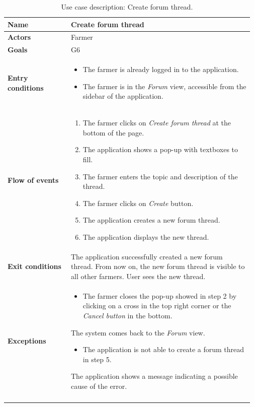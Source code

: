 \begin{longtable}{@{}p{0.25\linewidth} p{0.72\linewidth}@{}}
\toprule
	\textbf{Name}               & Create forum thread\\
	\midrule
	\textbf{Actors}             & Farmer\\
	\midrule
	\textbf{Goals}              & G6 \\
	\midrule
	
	\textbf{Entry conditions}   & \begin{itemize}[leftmargin=.4cm,noitemsep,topsep=0pt,before=\vspace{-3mm},after=\vspace{-4mm}]
	    \item The farmer is already logged in to the application.
	    \item The farmer is in the \textit{Forum} view, accessible from the sidebar of the application.
	\end{itemize}\\
	\midrule
	
	\textbf{Flow of events}     & \begin{enumerate}[leftmargin=.4cm,noitemsep,topsep=0pt,before=\vspace{-3mm},after=\vspace{-4mm}]
	    \item The farmer clicks on \textit{Create forum thread} at the bottom of the page.
	    \item The application shows a pop-up with textboxes to fill.
	    \item The farmer enters the topic and description of the thread.
	    \item The farmer clicks on \textit{Create} button.
	    \item The application creates a new forum thread.
	    \item The application displays the new thread.
	\end{enumerate}\\
	\midrule
	\textbf{Exit conditions}    & The application successfully created a new forum thread. From now on, the new forum thread is visible to all other farmers. User sees the new thread. \\
	\midrule
	
	\textbf{Exceptions}         & \begin{itemize}[leftmargin=.4cm,noitemsep,topsep=0pt,before=\vspace{-3mm}]
	   \item The farmer closes the pop-up showed in step 2 by clicking on a cross in the top right corner or the \textit{Cancel button} in the bottom.
	\end{itemize}
    The system comes back to the \textit{Forum} view.
    \begin{itemize}[leftmargin=.4cm,noitemsep,topsep=0pt]
	   \item The application is not able to create a forum thread in step 5. 
	\end{itemize}
	The application shows a message indicating a possible cause of the error.
    \\\bottomrule
	\caption{Use case description: Create forum thread.} 
\end{longtable}


